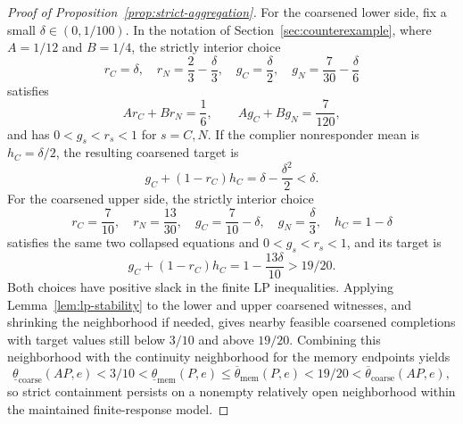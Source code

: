 \documentclass[11pt]{article}
\theoremstyle{definition}
\theoremstyle{plain}
\theoremstyle{remark}
\begin{document}
\begin{proof}[Proof of Proposition~\ref{prop:strict-aggregation}]
For the coarsened lower side, fix a small \(\delta\in(0,1/100)\).  In the notation of Section~\ref{sec:counterexample}, where \(A=1/12\) and \(B=1/4\), the strictly interior choice
\[
r_C=\delta,\quad
r_N=\frac23-\frac{\delta}{3},\quad
g_C=\frac{\delta}{2},\quad
g_N=\frac7{30}-\frac{\delta}{6}
\]
satisfies
\[
Ar_C+Br_N=\frac16,\qquad
Ag_C+Bg_N=\frac7{120},
\]
and has \(0<g_s<r_s<1\) for \(s=C,N\).  If the complier nonresponder mean is \(h_C=\delta/2\), the resulting coarsened target is
\[
g_C+(1-r_C)h_C=\delta-\frac{\delta^2}{2}<\delta.
\]
For the coarsened upper side, the strictly interior choice
\[
r_C=\frac7{10},\quad
r_N=\frac{13}{30},\quad
g_C=\frac7{10}-\delta,\quad
g_N=\frac{\delta}{3},\quad
h_C=1-\delta
\]
satisfies the same two collapsed equations and \(0<g_s<r_s<1\), and its target is
\[
g_C+(1-r_C)h_C=1-\frac{13\delta}{10}>19/20.
\]
Both choices have positive slack in the finite LP inequalities.  Applying Lemma~\ref{lem:lp-stability} to the lower and upper coarsened witnesses, and shrinking the neighborhood if needed, gives nearby feasible coarsened completions with target values still below \(3/10\) and above \(19/20\).  Combining this neighborhood with the continuity neighborhood for the memory endpoints yields
\[
\underline\theta_{\mathrm{coarse}}(A P,e)<3/10<
\underline\theta_{\mathrm{mem}}(P,e)
\le
\overline\theta_{\mathrm{mem}}(P,e)
<19/20<
\overline\theta_{\mathrm{coarse}}(A P,e),
\]
so strict containment persists on a nonempty relatively open neighborhood within the maintained finite-response model.
\end{proof}
\end{document}
